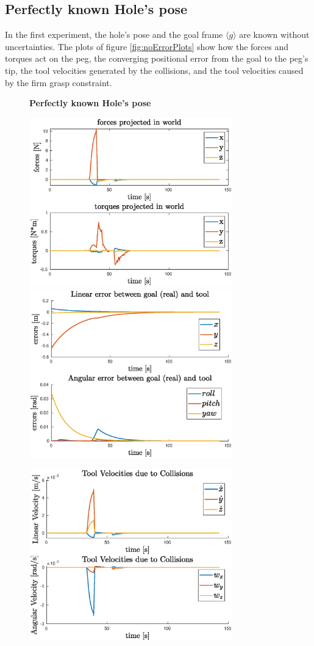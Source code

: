 \subsection{Perfectly known Hole's pose}
In the first experiment, the hole's pose and the goal frame $\langle g \rangle$ are known without uncertainties. The plots of figure \ref{fig:noErrorPlots} show how the forces and torques act on the peg, the converging positional error from the goal to the peg's tip, the tool velocities generated by the collisions, and the tool velocities caused by the firm grasp constraint.
\vspace{20px}
\begin{figure}[H]
	\centering
	\textbf{Perfectly known Hole's pose}\\
	\vspace{8px}
	\centerline{
		\includegraphics[width=8.8cm]{NOERROR/forces.eps}
		\includegraphics[width=8.8cm]{NOERROR/error.eps}
	}
	\vspace{6px}
	\centerline{
		\includegraphics[width=8.8cm]{NOERROR/collisions.eps}
}
\end{figure}
